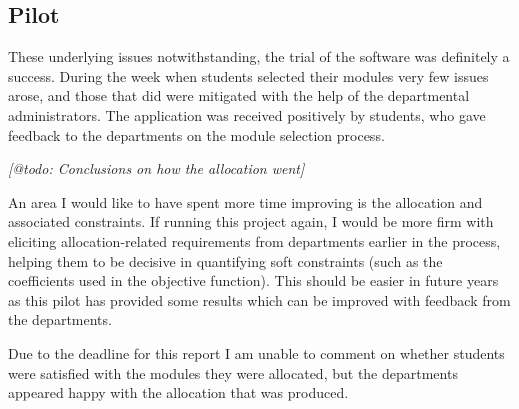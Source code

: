 \subsection{Pilot}

These underlying issues notwithstanding, the trial of the software was
definitely a success. During the week when students selected their modules
very few issues arose, and those that did were mitigated with the help of the
departmental administrators. The application was received positively by
students, who gave feedback to the departments on the module selection
process.

\emph{[@todo: Conclusions on how the allocation went]}


An area I would like to have spent more time improving is the allocation and
associated constraints. If running this project again, I would be more firm
with eliciting allocation-related requirements from departments earlier in the
process, helping them to be decisive in quantifying soft constraints (such as
the coefficients used in the objective function). This should be easier in
future years as this pilot has provided some results which can be improved
with feedback from the departments.

Due to the deadline for this report I am unable to comment on whether students
were satisfied with the modules they were allocated, but the departments
appeared happy with the allocation that was produced.
